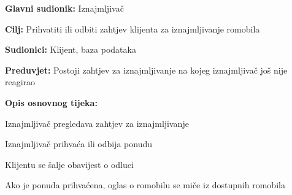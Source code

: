 						\noindent {}
						\begin{packed_item}
							
							\item \textbf{Glavni sudionik: }Iznajmljivač
							\item  \textbf{Cilj: }Prihvatiti ili odbiti zahtjev klijenta za iznajmljivanje romobila
							\item  \textbf{Sudionici: }Klijent, baza podataka
							\item  \textbf{Preduvjet: }Postoji zahtjev za iznajmljivanje na kojeg iznajmljivač još nije reagirao
							\item  \textbf{Opis osnovnog tijeka:}
							
							\item[] \begin{packed_enum}
								\item Iznajmljivač pregledava zahtjev za iznajmljivanje
								\item Iznajmljivač prihvaća ili odbija ponudu 
								\item Klijentu se šalje obavijest o odluci
								\item Ako je ponuda prihvaćena, oglas o romobilu se miče iz dostupnih romobila
								
								
							\end{packed_enum}	
						\end{packed_item}
						\noindent {}
